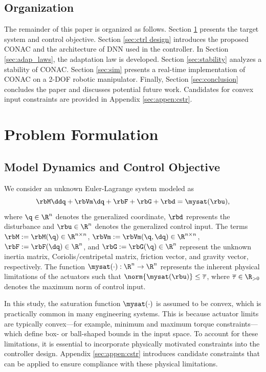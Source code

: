 \documentclass[letterpaper, journal]{IEEEtran}
\begin{document}
\subsection{Organization}

The remainder of this paper is organized as follows. 
Section \ref{sec:Problem Formulation} presents the target system and control objective.
Section \ref{sec:ctrl design} introduces the proposed CONAC and the architecture of DNN used in the controller. 
In Section \ref{sec:adap_laws}, the adaptation law is developed.
Section \ref{sec:stability} analyzes a stability of CONAC.
Section \ref{sec:sim} presents a real-time implementation of CONAC on a 2-DOF robotic manipulator.
Finally, Section \ref{sec:conclusion} concludes the paper and discusses potential future work.
Candidates for convex input constraints are provided in Appendix \ref{sec:appen:cstr}. 

\section{Problem Formulation}\label{sec:Problem Formulation}

\subsection{Model Dynamics and Control Objective}

We consider an unknown Euler-Lagrange system modeled as
\begin{equation}
    \rbM\ddq +\rbVm \dq+ \rbF + \rbG + \rbd
    =
    \mysat(\rbu)
    ,
    \label{eq:sys1}
\end{equation}
where $\q\in \R^n$ denotes the generalized coordinate, $\rbd$ represents the disturbance and $\rbu\in\R^n$ denotes the generalized control input. 
The terms $\rbM:=\rbM(\q)\in\R^{n\times n}$, $\rbVm:=\rbVm(\q,\dq)\in\R^{n\times n}$, $\rbF:=\rbF(\dq)\in\R^{n}$, and $\rbG:=\rbG(\q)\in\R^{n}$ represent the unknown inertia matrix, Coriolis/centripetal matrix, friction vector, and gravity vector, respectively.
The function $\mysat(\cdot):\R^n\to\R^n$ represents the inherent physical limitations of the actuators such that $\norm{\mysat(\rbu)}\le \overline\tau$, where $\overline\tau\in\R_{>0}$ denotes the maximum norm of control input.

In this study, the saturation function $\mysat(\cdot)$ is assumed to be convex, which is practically common in many engineering systems.
This is because actuator limits are typically convex—for example, minimum and maximum torque constraints—which define box- or ball-shaped bounds in the input space.
To account for these limitations, it is essential to incorporate physically motivated constraints into the controller design.
Appendix \ref{sec:appen:cstr} introduces candidate constraints that can be applied to ensure compliance with these physical limitations.
\end{document}
